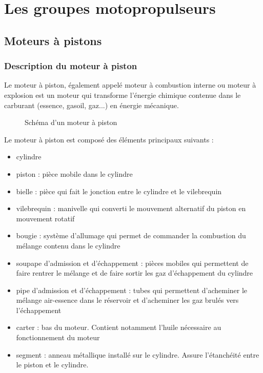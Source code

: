 

\section{Les groupes motopropulseurs}

	\subsection{Moteurs à pistons}
		\subsubsection{Description du moteur à piston}
		Le moteur à piston, également appelé moteur à combustion interne ou moteur à explosion est un moteur qui transforme l'énergie chimique contenue dans le carburant (essence, gasoil, gaz...) en énergie mécanique.
		\begin{figure}[H]
  		\centering
    		
  		\caption{Schéma d'un moteur à piston}
		\end{figure}
		
		Le moteur à piston est composé des éléments principaux suivants :
		\begin{itemize}
			\item cylindre
			\item piston : pièce mobile dans le cylindre
			\item bielle : pièce qui fait le jonction entre le cylindre et le vilebrequin
			\item vilebrequin : manivelle qui converti le mouvement alternatif du piston en mouvement rotatif
			\item bougie : système d'allumage qui permet de commander la combustion du mélange contenu dans le cylindre
			\item soupape d'admission et d'échappement : pièces mobiles qui permettent de faire rentrer le mélange et de faire sortir les gaz d'échappement du cylindre 
			\item pipe d'admission et d'échappement : tubes qui permettent d'acheminer le mélange air-essence dans le réservoir et d'acheminer les gaz brulés vers l'échappement
			\item carter : bas du moteur. Contient notamment l'huile nécessaire au fonctionnement du moteur
			\item segment : anneau métallique installé sur le cylindre. Assure l'étanchéité entre le piston et le cylindre.
		\end{itemize}
	
